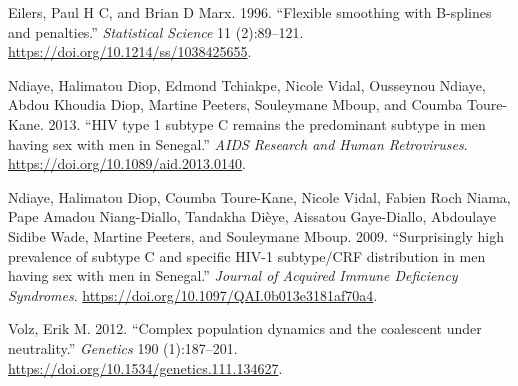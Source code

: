 \documentclass[12pt,]{article}
\begin{document}
\hypertarget{refs}{}
\leavevmode\hypertarget{ref-Eilers1996}{}%
Eilers, Paul H C, and Brian D Marx. 1996. ``Flexible smoothing with
B-splines and penalties.'' \emph{Statistical Science} 11 (2):89--121.
\url{https://doi.org/10.1214/ss/1038425655}.

\leavevmode\hypertarget{ref-Ndiaye2013}{}%
Ndiaye, Halimatou Diop, Edmond Tchiakpe, Nicole Vidal, Ousseynou Ndiaye,
Abdou Khoudia Diop, Martine Peeters, Souleymane Mboup, and Coumba
Toure-Kane. 2013. ``HIV type 1 subtype C remains the predominant subtype
in men having sex with men in Senegal.'' \emph{AIDS Research and Human
Retroviruses}. \url{https://doi.org/10.1089/aid.2013.0140}.

\leavevmode\hypertarget{ref-Ndiaye2009}{}%
Ndiaye, Halimatou Diop, Coumba Toure-Kane, Nicole Vidal, Fabien Roch
Niama, Pape Amadou Niang-Diallo, Tandakha Dièye, Aissatou Gaye-Diallo,
Abdoulaye Sidibe Wade, Martine Peeters, and Souleymane Mboup. 2009.
``Surprisingly high prevalence of subtype C and specific HIV-1
subtype/CRF distribution in men having sex with men in Senegal.''
\emph{Journal of Acquired Immune Deficiency Syndromes}.
\url{https://doi.org/10.1097/QAI.0b013e3181af70a4}.

\leavevmode\hypertarget{ref-Volz2012}{}%
Volz, Erik M. 2012. ``Complex population dynamics and the coalescent
under neutrality.'' \emph{Genetics} 190 (1):187--201.
\url{https://doi.org/10.1534/genetics.111.134627}.
\end{document}
